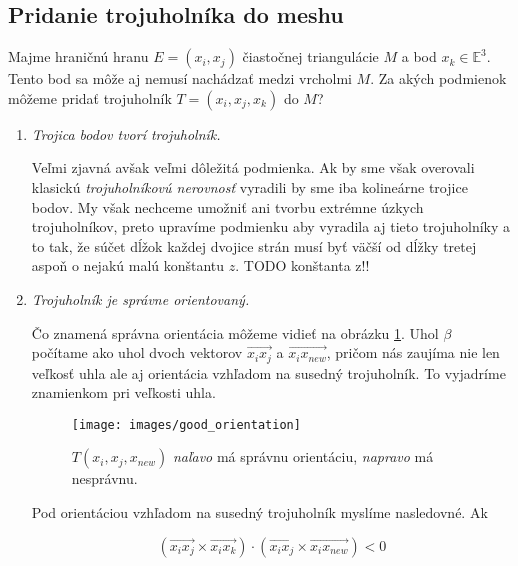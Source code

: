 \subsection{Pridanie trojuholníka do meshu}
\label{kap:triangle_conditions}

Majme hraničnú hranu $E=(x_i, x_j)$ čiastočnej triangulácie $M$ a bod $x_k \in \mathbb{E}^3$. 
Tento bod sa môže aj nemusí nachádzať medzi vrcholmi $M$. Za akých podmienok môžeme pridať trojuholník 
$T=(x_i, x_j, x_k)$ do $M$?

\begin{enumerate}
    \item{
        \textit{Trojica bodov tvorí trojuholník.}


        Veľmi zjavná avšak veľmi dôležitá podmienka. Ak by sme však overovali klasickú 
        \textit{trojuholníkovú nerovnosť} vyradili by sme iba kolineárne trojice bodov. My však nechceme 
        umožniť ani tvorbu extrémne úzkych trojuholníkov, preto upravíme podmienku aby vyradila aj tieto
        trojuholníky a to tak, že súčet dĺžok každej dvojice strán musí byť väčší od dĺžky tretej aspoň
        o nejakú malú konštantu $z$.
        TODO konštanta z!!
    } 

    \item{
        \textit{Trojuholník je správne orientovaný.}


        Čo znamená správna orientácia môžeme vidieť na obrázku \ref{obr:good_orientation}. Uhol $\beta$
        počítame ako uhol dvoch vektorov $\overrightarrow{x_i x_j}$ a $\overrightarrow{x_i x_{new}}$, 
        pričom nás zaujíma nie len veľkosť uhla ale aj orientácia vzhľadom na susedný trojuholník. To 
        vyjadríme znamienkom pri veľkosti uhla. 

        \begin{figure}
            \centerline{\texttt{[image: images/good\_orientation]}}
            \caption[]{$T(x_i, x_j, x_{new})$ \textit{naľavo} má správnu orientáciu, \textit{napravo} má nesprávnu.}
            \label{obr:good_orientation}
        \end{figure}

        Pod orientáciou vzhľadom na susedný trojuholník myslíme nasledovné.
        Ak

        $$(\overrightarrow{x_i x_j} \times \overrightarrow{x_i x_k}) 
        \cdot (\overrightarrow{x_i x_j} \times \overrightarrow{x_i x_{new}}) < 0$$

}
\end{enumerate}
